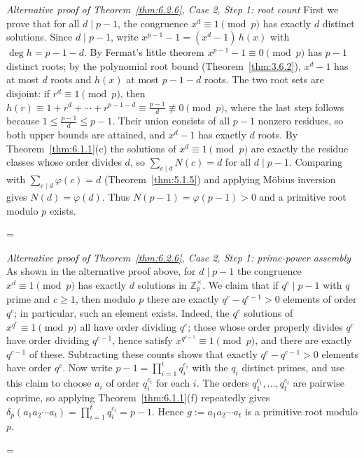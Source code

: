 \documentclass[11pt]{article}
\makeatletter
\theoremstyle{ntstyle}
\let\nt@closedisplay\]
\def\nt@guardedclose{\@ifnextchar\par{\nt@closeafterpar}{\@ifnextchar\end{\postdisplaypenalty\@M\nt@closedisplay}{\nt@closedisplay}}}
\def\nt@closeafterpar\par{\@ifnextchar\par{\nt@closeafterpar}{\@ifnextchar\end{\postdisplaypenalty\@M\nt@closedisplay\par}{\nt@closedisplay\par}}}
\renewenvironment{proof}[1][\proofname]{\par
  \pushQED{\qed}\normalfont\topsep\medskipamount\edef\nt@afterproof{\@endparpenalty=\the\@endparpenalty\relax}\@beginparpenalty\@M\@endparpenalty\@M\let\]\nt@guardedclose\trivlist\item[]\textit{#1\@addpunct{.}} \ignorespaces}{\ifvmode\addpenalty\@M\fi\popQED\nt@afterproof\endtrivlist\@endpefalse}
\newenvironment{altproof}[1][\proofname]{\begin{proof}[#1]\renewcommand{\qedsymbol}{}}{\end{proof}}
\newcommand{\ZmodUnits}[1]{\mathbb{Z}_{#1}^{\times}}
\makeatother
\begin{document}
\begin{altproof}[Alternative proof of Theorem~\ref{thm:6.2.6}, Case 2, Step 1: root count] First we prove that for all $d \mid p-1$, the congruence $x^{d}
		\equiv 1 \pmod{p}$ has exactly $d$ distinct solutions. Since $d \mid
		p-1$, write $x^{p-1} - 1 = (x^{d} - 1)\,h(x)$ with $\deg h = p - 1 -
		d$. By Fermat's little theorem $x^{p-1} - 1 \equiv 0 \pmod{p}$ has
	$p-1$ distinct roots; by the polynomial root bound
	(Theorem~\ref{thm:3.6.2}), $x^{d} - 1$ has at most $d$ roots
	and $h(x)$ at most $p-1-d$ roots. The two root sets are disjoint: if $r^{d}\equiv1\pmod{p}$, then $h(r)\equiv1+r^{d}+\cdots+r^{p-1-d}\equiv\frac{p-1}{d}\not\equiv0\pmod{p}$, where the last step follows because $1\le\frac{p-1}{d}\le p-1$. Their union consists of all $p-1$ nonzero residues, so both upper bounds are attained, and $x^d-1$ has exactly $d$ roots. By Theorem~\ref{thm:6.1.1}(c) the solutions of $x^{d}\equiv1\pmod{p}$ are exactly the residue classes whose order divides $d$, so $\sum_{c \mid d} N(c) = d$
	for all $d \mid p-1$. Comparing with $\sum_{c \mid d} \varphi(c) = d$ (Theorem~\ref{thm:5.1.5})
	and applying M{\"o}bius inversion gives $N(d) = \varphi(d)$. Thus
	$N(p-1) = \varphi(p-1) > 0$ and a primitive root modulo $p$ exists.

\end{altproof}
\begin{altproof}[Alternative proof of Theorem~\ref{thm:6.2.6}, Case 2, Step 1: prime-power assembly]
	As shown in the alternative proof above, for $d \mid p-1$ the congruence $x^{d}
		\equiv 1 \pmod{p}$ has exactly $d$ solutions in
	$\ZmodUnits{p}$. We claim that if $q^{c} \mid p-1$ with $q$ prime
	and $c \ge 1$, then modulo $p$ there are exactly $q^{c} - q^{c-1} >
		0$ elements of order $q^{c}$; in particular, such an element exists.
	Indeed, the $q^{c}$ solutions of $x^{q^{c}} \equiv 1 \pmod{p}$ all
	have order dividing $q^{c}$; those whose order properly divides
	$q^{c}$ have order dividing $q^{c-1}$, hence satisfy $x^{q^{c-1}}
		\equiv 1 \pmod{p}$, and there are exactly $q^{c-1}$ of these.
	Subtracting these counts shows that exactly $q^{c} - q^{c-1} > 0$ elements have order
	$q^{c}$. Now write $p-1 = \prod_{i=1}^{t} q_i^{c_i}$ with the $q_i$
	distinct primes, and use this claim to choose $a_i$ of order
	$q_i^{c_i}$ for each $i$. The orders $q_1^{c_1}, \ldots, q_t^{c_t}$
	are pairwise coprime, so applying Theorem~\ref{thm:6.1.1}(f) repeatedly gives
	$\delta_p(a_1 a_2 \cdots a_t) = \prod_{i=1}^{t} q_i^{c_i} = p-1$.
	Hence $g := a_1 a_2 \cdots a_t$ is a primitive root modulo $p$.

\end{altproof}
\end{document}
